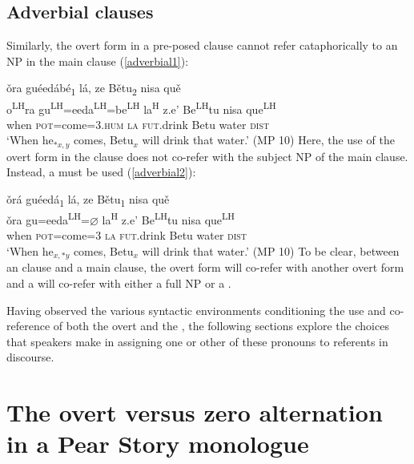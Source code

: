 \subsection{Adverbial clauses}

Similarly, the overt form in a pre-posed  clause cannot refer cataphorically to an NP in the main clause (\ref{adverbial1}):

\ea\label{adverbial1}
\glll \v{o}ra gu\'{e}ed\'{a}b\'{e}\textsubscript{1} l\'{a}, ze B\v{e}tu\textsubscript{2} nisa qu\v{e} \\
o\textsuperscript{LH}ra gu\textsuperscript{LH}=eeda\textsuperscript{LH}=be\textsuperscript{LH}  la\textsuperscript{H} z.e' Be\textsuperscript{LH}tu nisa que\textsuperscript{LH} \\
when \textsc{pot}=come=\textsc{3.hum} \textsc{la} \textsc{fut}.drink Betu water  \textsc{dist} \\
\glt `When he$_{*x, y}$ comes, Betu$_{x}$ will drink that water.'  \hfill{(MP 10)}
\z
Here, the use of the overt form in the  clause does not co-refer with the subject NP of the main clause. Instead, a  must be used (\ref{adverbial2}):

\ea\label{adverbial2}
\glll \v{o}r\'{a} gu\'{e}ed\'{a}\textsubscript{1} l\'{a}, ze B\v{e}tu\textsubscript{1} nisa qu\v{e} \\
\v{o}ra gu=eeda\textsuperscript{LH}={$\varnothing$} la\textsuperscript{H} z.e' Be\textsuperscript{LH}tu nisa que\textsuperscript{LH} \\
when \textsc{pot}=come=\textsc{3} \textsc{la} \textsc{fut}.drink Betu water  \textsc{dist} \\
\glt `When he$_{x, *y}$ comes, Betu$_{x}$ will drink that water.' \hfill{(MP 10)}
\z
To be clear, between an  clause and a main clause, the overt form will co-refer with another overt form and a  will co-refer with either a full NP or a . 

Having observed the various syntactic environments conditioning the use and co-reference of both the overt and the , the following sections explore the choices that speakers make in assigning one or other of these pronouns to referents in discourse.


\section{The overt versus zero alternation in a Pear Story monologue}

